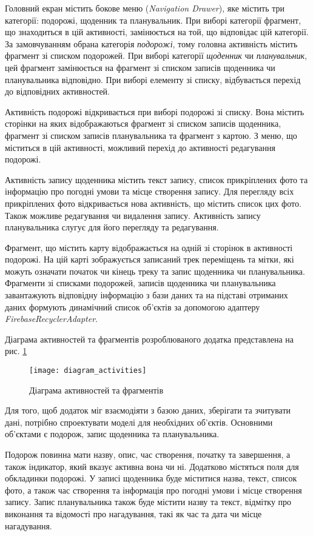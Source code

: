 \documentclass[../main.tex]{subfiles}
\begin{document}
Головний екран містить бокове меню (\textit{Navigation Drawer}), яке містить три категорії: подорожі, щоденник та планувальник. При виборі категорії фрагмент, що знаходиться в цій активності, замінюється на той, що відповідає цій категорії. За замовчуванням обрана категорія \textit{подорожі}, тому головна активність містить фрагмент зі списком подорожей. При виборі категорії \textit{щоденник} чи \textit{планувальник}, цей фрагмент замінюється на фрагмент зі списком записів щоденника чи планувальника відповідно. При виборі елементу зі списку, відбувається перехід до відповідних активностей.

Активність подорожі відкривається при виборі подорожі зі списку. Вона містить сторінки на яких відображаються фрагмент зі списком записів щоденника, фрагмент зі списком записів планувальника та фрагмент з картою. З меню, що міститься в цій активності, можливий перехід до активності редагування подорожі.

Активність запису щоденника містить текст запису, список прикріплених фото та інформацію про погодні умови та місце створення запису. Для перегляду всіх прикріплених фото відкривається нова активність, що містить список цих фото. Також можливе редагування чи видалення запису. Активність запису планувальника слугує для його перегляду та редагування.

Фрагмент, що містить карту відображається на одній зі сторінок в активності подорожі. На цій карті зображується записаний трек переміщень та мітки, які можуть означати початок чи кінець треку та запис щоденника чи планувальника. Фрагменти зі списками подорожей, записів щоденника чи планувальника завантажують відповідну інформацію з бази даних та на підставі отриманих даних формують динамічний список об'єктів за допомогою адаптеру \textit{FirebaseRecyclerAdapter}.

Діаграма активностей та фрагментів розроблюваного додатка представлена на рис. \ref{diagram:activities}

\begin{figure}[H]
	\centering
	\texttt{[image: diagram\_activities]}
	\caption{Діаграма активностей та фрагментів}
	\label{diagram:activities}
\end{figure}

Для того, щоб додаток міг взаємодіяти з базою даних, зберігати та зчитувати дані, потрібно спроектувати моделі для необхідних об'єктів. Основними об'єктами є подорож, запис щоденника та планувальника.

Подорож повинна мати назву, опис, час створення, початку та завершення, а також індикатор, який вказує активна вона чи ні. Додатково містяться поля для обкладинки подорожі. У записі щоденника буде міститися назва, текст, список фото, а також час створення та інформація про погодні умови і місце створення запису. Запис планувальника також буде містити назву та текст, відмітку про виконання та відомості про нагадування, такі як час та дата чи місце нагадування.
\end{document}
